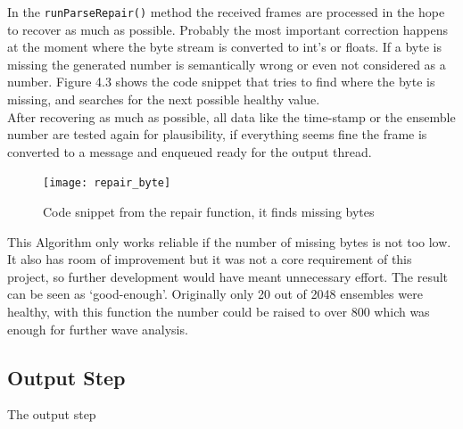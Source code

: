 In the \texttt{runParseRepair()} method the received frames are processed in the hope to recover as much as possible. Probably the most important correction happens at the moment where the byte stream is converted to int's or floats. If a byte is missing the generated number is semantically wrong or even not considered as a number. Figure 4.3 shows the code snippet that tries to find where the byte is missing, and searches for the next possible healthy value.\\
After recovering as much as possible, all data like the time-stamp or the ensemble number are tested again for plausibility, if everything seems fine the frame is converted to a message and enqueued ready for the output thread.
\begin{figure}[h]
\centering
      \texttt{[image: repair\_byte]}
        \caption{Code snippet from the repair function, it finds missing bytes}
\end{figure}
This Algorithm only works reliable if the number of missing bytes is not too low. It also has room of improvement but it was not a core requirement of this project, so further development would have meant unnecessary effort. The result can be seen as `good-enough'. Originally only 20 out of 2048 ensembles were healthy, with this function the number could be raised to over 800 which was enough for further wave analysis.

\subsection{Output Step}
The output step 



 